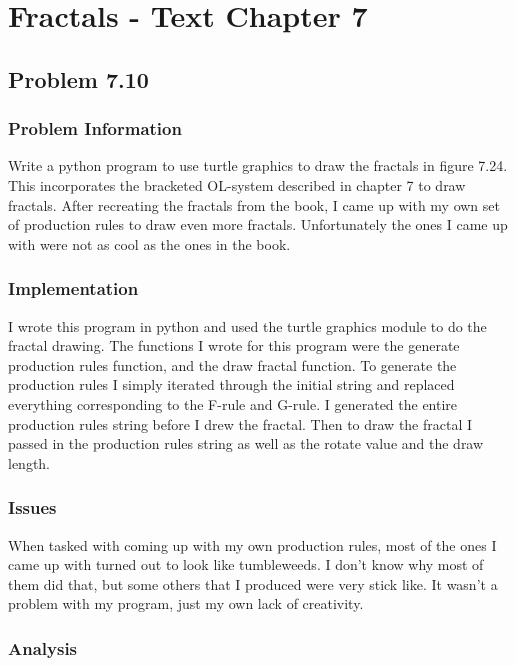 
\chapter{Fractals - Text Chapter 7}



\section{Problem 7.10}


\subsection{Problem Information}

	Write a python program to use turtle graphics to draw the fractals in figure 7.24.  This incorporates the bracketed OL-system described in chapter 7 to draw fractals.  After recreating the fractals from the book, I came up with my own set of production rules to draw even more fractals.  Unfortunately the ones I came up with were not as cool as the ones in the book.

\subsection{Implementation}

	I wrote this program in python and used the turtle graphics module to do the fractal drawing.  The functions I wrote for this program were the generate production rules function, and the draw fractal function.  To generate the production rules I simply iterated through the initial string and replaced everything corresponding to the F-rule and G-rule.  I generated the entire production rules string before I drew the fractal.  Then to draw the fractal I passed in the production rules string as well as the rotate value and the draw length.

\subsection{Issues}

	When tasked with coming up with my own production rules, most of the ones I came up with turned out to look like tumbleweeds.  I don't know why most of them did that, but some others that I produced were very stick like.  It wasn't a problem with my program, just my own lack of creativity.
	
\subsection{Analysis}

